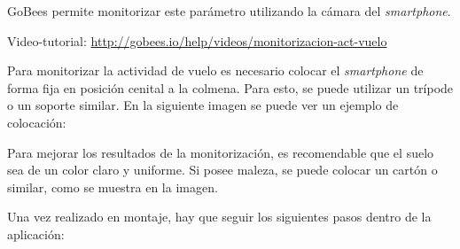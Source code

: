 GoBees permite monitorizar este parámetro utilizando la cámara del
\emph{smartphone}.

Video-tutorial:
\url{http://gobees.io/help/videos/monitorizacion-act-vuelo}

Para monitorizar la actividad de vuelo es necesario colocar el
\emph{smartphone} de forma fija en posición cenital a la colmena. Para
esto, se puede utilizar un trípode o un soporte similar. En la siguiente
imagen se puede ver un ejemplo de colocación:


Para mejorar los resultados de la monitorización, es recomendable que el
suelo sea de un color claro y uniforme. Si posee maleza, se puede
colocar un cartón o similar, como se muestra en la imagen.

Una vez realizado en montaje, hay que seguir los siguientes pasos dentro
de la aplicación:

